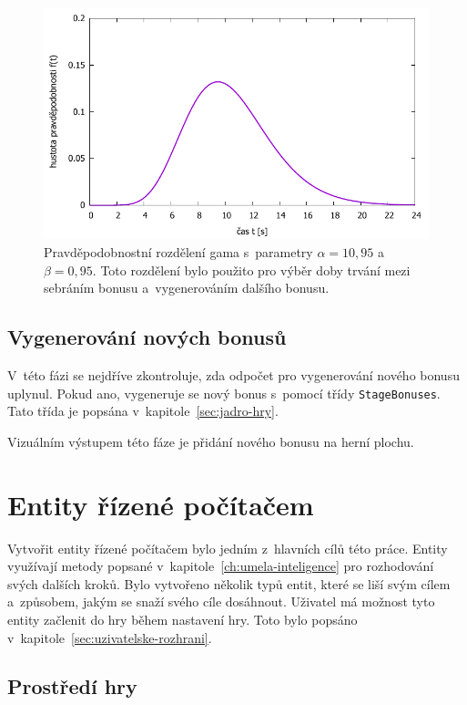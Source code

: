 \begin{figure}[ht]
    \centering
    \includegraphics{obrazky-figures/gamma_distribution.pdf}
    \caption{Pravděpodobnostní rozdělení gama s~parametry $\alpha = 10{,}95$ a~$\beta = 0{,}95$. Toto rozdělení bylo použito pro výběr doby trvání mezi sebráním bonusu a~vygenerováním dalšího bonusu.}
    \label{fig:probability-bonus-countdown}
\end{figure}

\subsection*{Vygenerování nových bonusů}

V~této fázi se nejdříve zkontroluje, zda odpočet pro vygenerování nového bonusu uplynul. Pokud ano, vygeneruje se nový bonus s~pomocí třídy \texttt{StageBonuses}. Tato třída je popsána v~kapitole~\ref{sec:jadro-hry}.

Vizuálním výstupem této fáze je přidání nového bonusu na herní plochu.


\section{Entity řízené počítačem}
\label{sec:entity-rizene-pocitacem}

Vytvořit entity řízené počítačem bylo jedním z~hlavních cílů této práce. Entity využívají metody popsané v~kapitole~\ref{ch:umela-inteligence} pro rozhodování svých dalších kroků. Bylo vytvořeno několik typů entit, které se liší svým cílem a~způsobem, jakým se snaží svého cíle dosáhnout. Uživatel má možnost tyto entity začlenit do hry během nastavení hry. Toto bylo popsáno v~kapitole~\ref{sec:uzivatelske-rozhrani}.

\subsection{Prostředí hry}

